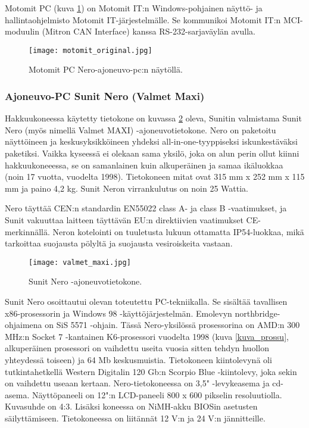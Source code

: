 Motomit PC (kuva \ref{motomit:kuvankaappaus}) on Motomit IT:n Windows-pohjainen näyttö- ja hallintaohjelmisto Motomit IT-järjestelmälle. Se kommunikoi Motomit IT:n MCI-moduulin (Mitron CAN Interface) kanssa RS-232-sarjaväylän avulla. \citep{motomit:esite}
\newline
\begin{figure}[H]
\centering
\texttt{[image: motomit\_original.jpg]}
\caption{Motomit PC Nero-ajoneuvo-pc:n näytöllä.}
\label{motomit:kuvankaappaus}
\end{figure}

\subsubsection{Ajoneuvo-PC Sunit Nero (Valmet Maxi)}
Hakkuukoneessa käytetty tietokone on kuvassa \ref{kuva_nero} oleva, Sunitin valmistama Sunit Nero (myös nimellä Valmet MAXI) -ajoneuvotietokone. Nero on paketoitu näyttöineen ja keskusyksikköineen yhdeksi all-in-one-tyyppiseksi iskunkestäväksi paketiksi. Vaikka kyseessä ei olekaan sama yksilö, joka on alun perin ollut kiinni hakkuukoneeessa, se on samanlainen kuin alkuperäinen ja samaa ikäluokkaa (noin 17 vuotta, vuodelta 1998). Tietokoneen mitat ovat 315 mm x 252 mm x 115 mm ja paino 4,2 kg. Sunit Neron virrankulutus on noin 25 Wattia.

Nero täyttää CEN:n standardin EN55022 class A- ja class B -vaatimukset, ja Sunit vakuuttaa laitteen täyttävän EU:n direktiivien vaatimukset CE-merkinnällä. Neron kotelointi on tuuletusta lukuun ottamatta IP54-luokkaa, mikä tarkoittaa suojausta pölyltä ja suojausta vesiroiskeita vastaan. \citep{nero:manual}

\begin{figure}[H]
\centering
\texttt{[image: valmet\_maxi.jpg]}
\caption{Sunit Nero -ajoneuvotietokone.}
\label{kuva_nero}
\end{figure}

Sunit Nero osoittautui olevan toteutettu PC-tekniikalla. Se sisältää tavallisen x86-prosessorin ja Windows 98 -käyttöjärjestelmän. Emolevyn northbridge-ohjaimena on SiS 5571 -ohjain. Tässä Nero-yksilössä prosessorina on AMD:n 300 MHz:n Socket 7 -kantainen K6-prosessori vuodelta 1998 (kuva \ref{kuva_prossu}, alkuperäinen prosessori on vaihdettu useita vuosia sitten tehdyn huollon yhteydessä toiseen) ja 64 Mb keskusmuistia. Tietokoneen kiintolevynä oli tutkintahetkellä Western Digitalin 120 Gb:n Scorpio Blue -kiintolevy, joka sekin on vaihdettu useaan kertaan. Nero-tietokoneessa on 3,5" -levykeasema ja cd-asema. Näyttöpaneeli on 12":n LCD-paneeli 800 x 600 pikselin resoluutiolla. Kuvasuhde on 4:3. Lisäksi koneessa on NiMH-akku BIOSin asetusten säilyttämiseen. Tietokoneessa on liitännät 12 V:n ja 24 V:n jännitteille. \citep{nero:manual}
\newline\newline

